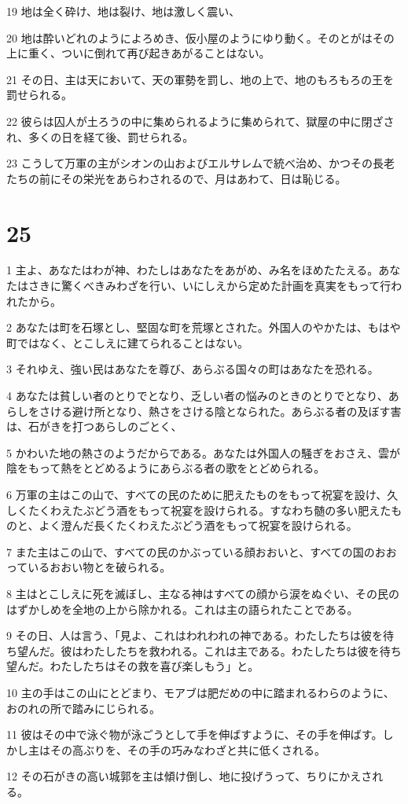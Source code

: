 \par 19 地は全く砕け、地は裂け、地は激しく震い、
\par 20 地は酔いどれのようによろめき、仮小屋のようにゆり動く。そのとがはその上に重く、ついに倒れて再び起きあがることはない。
\par 21 その日、主は天において、天の軍勢を罰し、地の上で、地のもろもろの王を罰せられる。
\par 22 彼らは囚人が土ろうの中に集められるように集められて、獄屋の中に閉ざされ、多くの日を経て後、罰せられる。
\par 23 こうして万軍の主がシオンの山およびエルサレムで統べ治め、かつその長老たちの前にその栄光をあらわされるので、月はあわて、日は恥じる。

\chapter{25}

\par 1 主よ、あなたはわが神、わたしはあなたをあがめ、み名をほめたたえる。あなたはさきに驚くべきみわざを行い、いにしえから定めた計画を真実をもって行われたから。
\par 2 あなたは町を石塚とし、堅固な町を荒塚とされた。外国人のやかたは、もはや町ではなく、とこしえに建てられることはない。
\par 3 それゆえ、強い民はあなたを尊び、あらぶる国々の町はあなたを恐れる。
\par 4 あなたは貧しい者のとりでとなり、乏しい者の悩みのときのとりでとなり、あらしをさける避け所となり、熱さをさける陰となられた。あらぶる者の及ぼす害は、石がきを打つあらしのごとく、
\par 5 かわいた地の熱さのようだからである。あなたは外国人の騒ぎをおさえ、雲が陰をもって熱をとどめるようにあらぶる者の歌をとどめられる。
\par 6 万軍の主はこの山で、すべての民のために肥えたものをもって祝宴を設け、久しくたくわえたぶどう酒をもって祝宴を設けられる。すなわち髄の多い肥えたものと、よく澄んだ長くたくわえたぶどう酒をもって祝宴を設けられる。
\par 7 また主はこの山で、すべての民のかぶっている顔おおいと、すべての国のおおっているおおい物とを破られる。
\par 8 主はとこしえに死を滅ぼし、主なる神はすべての顔から涙をぬぐい、その民のはずかしめを全地の上から除かれる。これは主の語られたことである。
\par 9 その日、人は言う、「見よ、これはわれわれの神である。わたしたちは彼を待ち望んだ。彼はわたしたちを救われる。これは主である。わたしたちは彼を待ち望んだ。わたしたちはその救を喜び楽しもう」と。
\par 10 主の手はこの山にとどまり、モアブは肥だめの中に踏まれるわらのように、おのれの所で踏みにじられる。
\par 11 彼はその中で泳ぐ物が泳ごうとして手を伸ばすように、その手を伸ばす。しかし主はその高ぶりを、その手の巧みなわざと共に低くされる。
\par 12 その石がきの高い城郭を主は傾け倒し、地に投げうって、ちりにかえされる。

